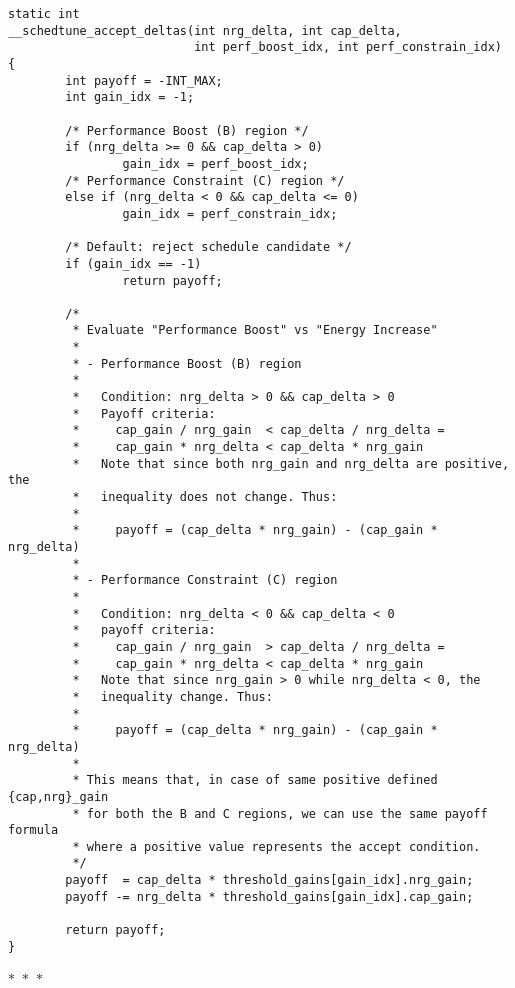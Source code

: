 \documentclass{article}
\newcommand{\divider}{{\begin{center}
  $\ast$~$\ast$~$\ast$
\end{center}}}
\begin{document}
\begin{verbatim}
static int
__schedtune_accept_deltas(int nrg_delta, int cap_delta,
                          int perf_boost_idx, int perf_constrain_idx)
{
        int payoff = -INT_MAX;
        int gain_idx = -1;

        /* Performance Boost (B) region */
        if (nrg_delta >= 0 && cap_delta > 0)
                gain_idx = perf_boost_idx;
        /* Performance Constraint (C) region */
        else if (nrg_delta < 0 && cap_delta <= 0)
                gain_idx = perf_constrain_idx;

        /* Default: reject schedule candidate */
        if (gain_idx == -1)
                return payoff;

        /*
         * Evaluate "Performance Boost" vs "Energy Increase"
         *
         * - Performance Boost (B) region
         *
         *   Condition: nrg_delta > 0 && cap_delta > 0
         *   Payoff criteria:
         *     cap_gain / nrg_gain  < cap_delta / nrg_delta =
         *     cap_gain * nrg_delta < cap_delta * nrg_gain
         *   Note that since both nrg_gain and nrg_delta are positive, the
         *   inequality does not change. Thus:
         *
         *     payoff = (cap_delta * nrg_gain) - (cap_gain * nrg_delta)
         *
         * - Performance Constraint (C) region
         *
         *   Condition: nrg_delta < 0 && cap_delta < 0
         *   payoff criteria:
         *     cap_gain / nrg_gain  > cap_delta / nrg_delta =
         *     cap_gain * nrg_delta < cap_delta * nrg_gain
         *   Note that since nrg_gain > 0 while nrg_delta < 0, the
         *   inequality change. Thus:
         *
         *     payoff = (cap_delta * nrg_gain) - (cap_gain * nrg_delta)
         *
         * This means that, in case of same positive defined {cap,nrg}_gain
         * for both the B and C regions, we can use the same payoff formula
         * where a positive value represents the accept condition.
         */
        payoff  = cap_delta * threshold_gains[gain_idx].nrg_gain;
        payoff -= nrg_delta * threshold_gains[gain_idx].cap_gain;

        return payoff;
}
\end{verbatim}
\divider
\end{document}
